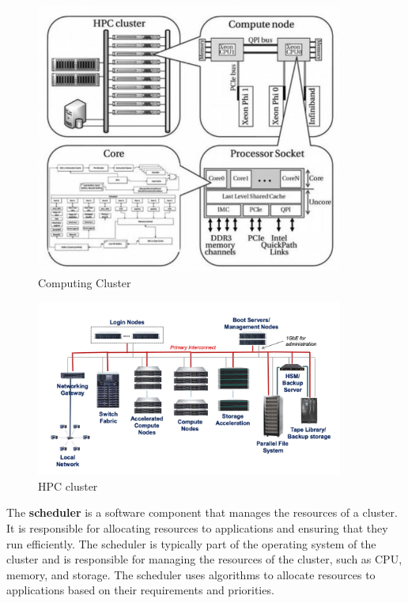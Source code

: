 \begin{minipage}[t]{0.35\textwidth}
    \begin{figure}[H]
        \centering
        \includegraphics[width=0.9\textwidth]{assets/fig25.png}
        \caption{Computing Cluster}
    \end{figure}
\end{minipage}
\begin{minipage}[t]{0.55\textwidth}
    \begin{figure}[H]
        \centering
        \includegraphics[width=0.9\textwidth]{assets/fig26.png}
        \caption{HPC cluster}
    \end{figure}
\end{minipage}


The \textbf{scheduler} is a software component that manages the resources of a
cluster. It is responsible for allocating resources to applications and
ensuring that they run efficiently. The scheduler is typically part of the
operating system of the cluster and is responsible for managing the
resources of the cluster, such as CPU, memory, and storage. The scheduler
uses algorithms to allocate resources to applications based on their
requirements and priorities.

